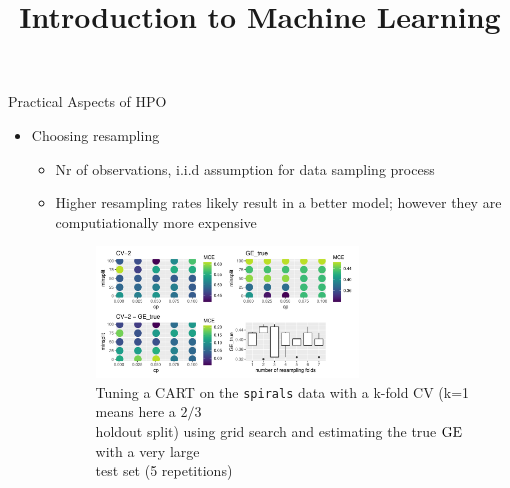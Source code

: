 \documentclass[11pt,compress,t,notes=noshow, xcolor=table]{beamer}
\title{Introduction to Machine Learning}
\institute{\href{https://compstat-lmu.github.io/lecture_i2ml/}{compstat-lmu.github.io/lecture\_i2ml}}
\date{}
\begin{document}
\sloppy

\begin{vbframe}{Practical Aspects of HPO}
\begin{itemize}
    \item Choosing resampling
    \begin{itemize} 
        \item Nr of observations, i.i.d assumption for data sampling process
        \item Higher resampling rates likely result in a better model; however they are computiationally more expensive \\
        \begin{figure}\includegraphics[width=0.7\textwidth]{figure/resa_hpo.pdf}
        \caption{\footnotesize Tuning a CART on the \texttt{spirals} data with a k-fold CV (k=1 means here a $2/3$ \\ holdout split) using grid search and estimating the true $\mathrm{GE}$ with a very large \\test set (5 repetitions)}
        \end{figure}
    \end{itemize}
\end{itemize}
\end{vbframe}
\end{document}
